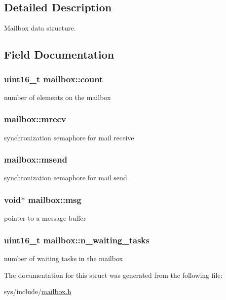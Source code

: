 \subsection{Detailed Description}
Mailbox data structure. 

\subsection{Field Documentation}
\hypertarget{structmailbox_ae99432557a6663a6e7b43b27b4448c9c}{
\subsubsection[{count}]{\setlength{\rightskip}{0pt plus 5cm}uint16\-\_\-t mailbox\-::count}}\label{structmailbox_ae99432557a6663a6e7b43b27b4448c9c}
number of elements on the mailbox \hypertarget{structmailbox_aab51b97fffcc79e7398d8fadd8b0d3cb}{
\subsubsection[{mrecv}]{ mailbox\-::mrecv}}\label{structmailbox_aab51b97fffcc79e7398d8fadd8b0d3cb}
synchronization semaphore for mail receive \hypertarget{structmailbox_a061152c5d6eb8b70f1056c385c6cce73}{
\subsubsection[{msend}]{ mailbox\-::msend}}\label{structmailbox_a061152c5d6eb8b70f1056c385c6cce73}
synchronization semaphore for mail send \hypertarget{structmailbox_a2568c0b3f722bca8beb8e85824806258}{
\subsubsection[{msg}]{\setlength{\rightskip}{0pt plus 5cm}void$\ast$ mailbox\-::msg}}\label{structmailbox_a2568c0b3f722bca8beb8e85824806258}
pointer to a message buffer \hypertarget{structmailbox_a7d31234908ebf91baf3dfbc8507f823e}{
\subsubsection[{n\-\_\-waiting\-\_\-tasks}]{\setlength{\rightskip}{0pt plus 5cm}uint16\-\_\-t mailbox\-::n\-\_\-waiting\-\_\-tasks}}\label{structmailbox_a7d31234908ebf91baf3dfbc8507f823e}
number of waiting tasks in the mailbox 

The documentation for this struct was generated from the following file\-:\begin{DoxyCompactItemize}
\item 
sys/include/\hyperlink{mailbox_8h}{mailbox.\-h}\end{DoxyCompactItemize}
